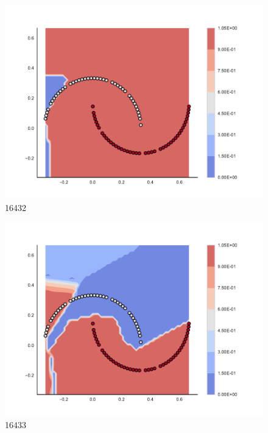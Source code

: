 \begin{subfigure}[b]{0.09\textwidth}
    \includegraphics[clip, trim=2.35cm 1.75cm 4.5cm 0cm,width=\textwidth]{img/convergence/16432.pdf}
    \caption{16432}
    \label{fig:convergence_16432}
\end{subfigure}
%
\begin{subfigure}[b]{0.09\textwidth}
    \includegraphics[clip, trim=2.35cm 1.75cm 4.5cm 0cm,width=\textwidth]{img/convergence/16433.pdf}
    \caption{16433}
    \label{fig:convergence_16433}
\end{subfigure}
%
